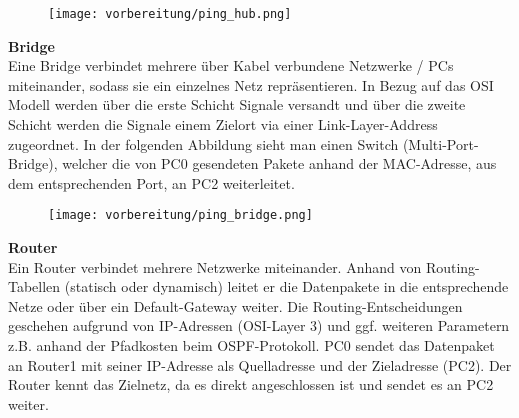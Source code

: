     \begin{figure}[H]
        \centering
        \texttt{[image: vorbereitung/ping\_hub.png]}
    \end{figure}
    \vspace{0cm}
    \textbf{Bridge}
    \\
    Eine Bridge verbindet mehrere über Kabel verbundene Netzwerke / PCs miteinander, sodass sie ein einzelnes Netz repräsentieren. In Bezug auf das OSI Modell werden über die erste Schicht Signale versandt und über die zweite Schicht werden die Signale einem Zielort via einer Link-Layer-Address zugeordnet. In der folgenden Abbildung sieht man einen Switch (Multi-Port-Bridge), welcher die von PC0 gesendeten Pakete anhand der MAC-Adresse, aus dem entsprechenden Port, an PC2 weiterleitet. \\

    \begin{figure}[H]
        \centering
        \texttt{[image: vorbereitung/ping\_bridge.png]}
    \end{figure}
    \vspace{0cm}
    \textbf{Router}
    \\
    Ein Router verbindet mehrere Netzwerke miteinander. Anhand von Routing-Tabellen (statisch oder dynamisch) leitet er die Datenpakete in die entsprechende Netze oder über ein Default-Gateway weiter. Die Routing-Entscheidungen geschehen aufgrund von IP-Adressen (OSI-Layer 3) und ggf. weiteren Parametern z.B. anhand der Pfadkosten beim OSPF-Protokoll. PC0 sendet das Datenpaket an Router1 mit seiner IP-Adresse als Quelladresse und der Zieladresse (PC2). Der Router kennt das Zielnetz, da es direkt angeschlossen ist und sendet es an PC2 weiter.\\

